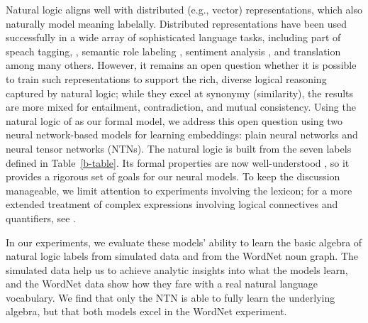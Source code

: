 \documentclass[letterpaper]{article}
\begin{document}
Natural logic aligns well with distributed (e.g., vector)
representations, which also naturally model meaning labelally.
Distributed representations have been used successfully in a wide
array of sophisticated language tasks, including part of speach tagging,
\cite{collobert2011natural}, semantic role labeling \cite{collobert2011natural},
sentiment analysis \cite{socher2011semi}, and translation \cite{sutskever2014sequence} 
among many others.
However, it remains an open question whether it is possible to train
such representations to support the rich, diverse logical reasoning
captured by natural logic; while they excel at synonymy (similarity),
the results are more mixed for entailment, contradiction, and mutual
consistency.  Using the natural logic of \cite{maccartney2009extended}
as our formal model, we address this open question using two neural
network-based models for learning embeddings: plain neural networks
and neural tensor networks (NTNs).  The natural logic is built from
the seven labels defined in Table~\ref{b-table}. Its formal
properties are now well-understood \cite{Icard:Moss:2013,Icard:Moss:2013:LILT}, so it
provides a rigorous set of goals for our neural models. To keep the
discussion manageable, we limit attention to experiments involving the
lexicon; for a more extended treatment of complex expressions
involving logical connectives and quantifiers, see
\cite{Bowman:Potts:Manning:2014}. %

In our experiments, we evaluate these models' ability to learn the
basic algebra of natural logic labels from simulated data and from
the WordNet noun graph. The simulated data help us to achieve analytic
insights into what the models learn, and the WordNet data show how they
fare with a real natural language vocabulary.  We find that only the NTN is able to fully
learn the underlying algebra, but that both models excel in the 
WordNet experiment.
\end{document}
